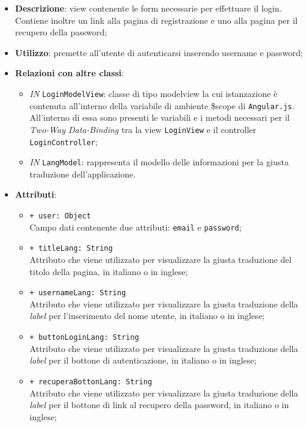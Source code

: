 \begin{itemize}
	\item \textbf{Descrizione}: view contenente le form necessarie per effettuare il login. Contiene inoltre un link alla pagina di registrazione e uno alla pagina per il recupero della password;
	\item \textbf{Utilizzo}: premette all'utente di autenticarsi inserendo username e password;
	\item \textbf{Relazioni con altre classi}:
	\begin{itemize}
		\item \textit{IN} \texttt{LoginModelView}: classe di tipo modelview la cui istanzazione è contenuta all'interno della variabile di ambiente \$scope di \texttt{Angular.js}. All'interno di essa sono presenti le variabili e i metodi necessari per il \textit{Two-Way Data-Binding} tra la view \texttt{LoginView} e il controller \texttt{LoginController};
		\item \textit{IN} \texttt{LangModel}: rappresenta il modello delle informazioni per la giusta traduzione dell'applicazione.
	\end{itemize}
	\item \textbf{Attributi}:
	\begin{itemize}
		\item \texttt{+ user: Object} \\ Campo dati contenente due attributi: \texttt{email} e \texttt{password};
		\item \texttt{+ titleLang: String} \\ Attributo che viene utilizzato per visualizzare la giusta traduzione del titolo della pagina, in italiano o in inglese;
		\item \texttt{+ usernameLang: String} \\ Attributo che viene utilizzato per visualizzare la giusta traduzione della \textit{label} per l'inserimento del nome utente, in italiano o in inglese; 
		\item \texttt{+ buttonLoginLang: String} \\ Attributo che viene utilizzato per visualizzare la giusta traduzione della \textit{label} per il bottone di autenticazione, in italiano o in inglese;
		\item \texttt{+ recuperaBottonLang: String} \\ Attributo che viene utilizzato per visualizzare la giusta traduzione della \textit{label} per il bottone di link al recupero della password, in italiano o in inglese;

\end{itemize}
\end{itemize}

